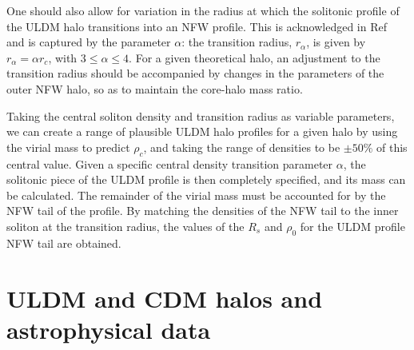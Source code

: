 \documentclass{pasa}%
\begin{document}
One should also allow for variation in the radius at which the solitonic profile of the ULDM halo transitions into an NFW profile. This is acknowledged in Ref~\cite{Robles:2018fur} and is captured by the parameter $\alpha$: the transition radius, $r_{\alpha}$, is given by $r_{\alpha} = \alpha r_c$, with $3 \leq \alpha \leq 4$. For a given theoretical halo, an adjustment to the transition radius should be accompanied by changes in the parameters of the outer NFW halo, so as to maintain the core-halo mass ratio.

Taking the central soliton density and transition radius as variable parameters, we can create a range of plausible ULDM halo profiles for a given halo by using the virial mass to predict $\rho_c$, and taking the range of densities to be $\pm 50\% $ of this central value. Given a specific central density transition parameter $\alpha$, the solitonic piece of the ULDM profile is then completely specified, and its mass can be calculated. The remainder of the virial mass must be accounted for by the NFW tail of the profile. By matching the densities of the NFW tail to the inner soliton at the transition radius, the values of the $R_s$ and $\rho_0$ for the ULDM profile NFW tail are obtained.  



\section{ULDM and CDM halos and astrophysical data}\label{sec:velocity}
\end{document}
